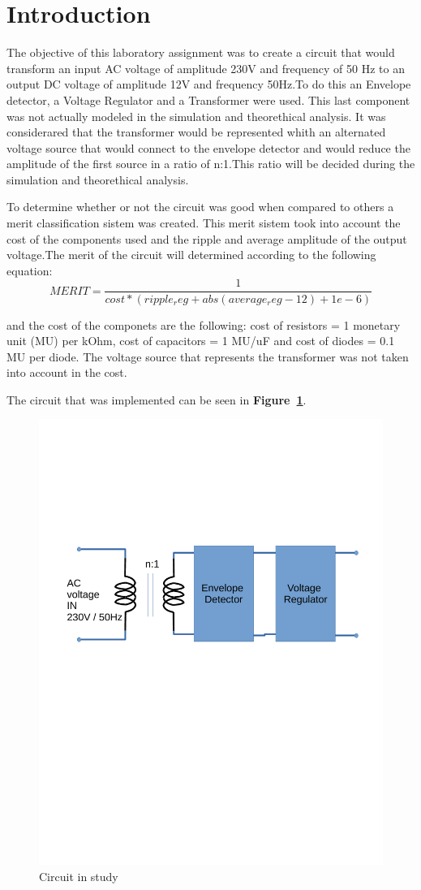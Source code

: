 \section{Introduction}
\label{sec:introduction}


\par The objective of this laboratory assignment was to create a circuit that would transform an input AC voltage of amplitude 230V and frequency of 50 Hz to an output DC voltage of amplitude 12V and frequency 50Hz.To do this an Envelope detector, a Voltage Regulator and a Transformer were used. This last component was not actually modeled in the simulation and theorethical analysis. It was considerared that the transformer would be represented whith an alternated voltage source that would connect to the envelope detector and would reduce the amplitude of the first source in a ratio of n:1.This ratio will be decided during the simulation and theorethical analysis.\par
To determine whether or not the circuit was good when compared to others a merit classification sistem was created. This merit sistem took into account the cost of the components used and the ripple and average amplitude of the output voltage.The merit of the circuit will determined according to the following equation: 
\begin {equation}
	MERIT = \dfrac{1}{cost*(ripple_reg + abs(average_reg - 12) + 1e-6)}	
	\label{eq:i1}
\end{equation}

and the cost of the componets are the following: cost of resistors = 1 monetary unit (MU) per kOhm, cost of capacitors = 1 MU/uF
and cost of diodes = 0.1 MU per diode. The voltage source that represents the transformer was not taken into account in the cost. 
 
The circuit that was implemented can be seen in \textbf{Figure~\ref{fig:circuit_t3}}.\par
\begin{figure}[h] \centering
\includegraphics[width=0.6\linewidth]{circuit_t3.pdf}
\caption{Circuit in study}
\label{fig:circuit_t3}
\end{figure}


